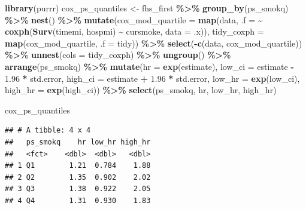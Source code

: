 \documentclass[
]{book}
\newenvironment{Shaded}{\begin{snugshade}}{\end{snugshade}}
\newcommand{\AttributeTok}[1]{\textcolor[rgb]{0.13,0.29,0.53}{#1}}
\newcommand{\FloatTok}[1]{\textcolor[rgb]{0.00,0.00,0.81}{#1}}
\newcommand{\FunctionTok}[1]{\textcolor[rgb]{0.13,0.29,0.53}{\textbf{#1}}}
\newcommand{\NormalTok}[1]{#1}
\newcommand{\OtherTok}[1]{\textcolor[rgb]{0.56,0.35,0.01}{#1}}
\newcommand{\SpecialCharTok}[1]{\textcolor[rgb]{0.81,0.36,0.00}{\textbf{#1}}}
\begin{document}
\begin{Shaded}
\begin{Highlighting}[]
\FunctionTok{library}\NormalTok{(purrr)}
\NormalTok{cox\_ps\_quantiles }\OtherTok{\textless{}{-}}\NormalTok{ fhs\_first }\SpecialCharTok{\%\textgreater{}\%} 
  \FunctionTok{group\_by}\NormalTok{(ps\_smokq) }\SpecialCharTok{\%\textgreater{}\%} 
  \FunctionTok{nest}\NormalTok{() }\SpecialCharTok{\%\textgreater{}\%} 
  \FunctionTok{mutate}\NormalTok{(}\AttributeTok{cox\_mod\_quartile =} \FunctionTok{map}\NormalTok{(data, }
                                \AttributeTok{.f =} \SpecialCharTok{\textasciitilde{}} \FunctionTok{coxph}\NormalTok{(}\FunctionTok{Surv}\NormalTok{(timemi, hospmi) }\SpecialCharTok{\textasciitilde{}} 
\NormalTok{                                               cursmoke, }
                                             \AttributeTok{data =}\NormalTok{ .x)),}
         \AttributeTok{tidy\_coxph =} \FunctionTok{map}\NormalTok{(cox\_mod\_quartile, }\AttributeTok{.f =}\NormalTok{ tidy)) }\SpecialCharTok{\%\textgreater{}\%} 
  \FunctionTok{select}\NormalTok{(}\SpecialCharTok{{-}}\FunctionTok{c}\NormalTok{(data, cox\_mod\_quartile)) }\SpecialCharTok{\%\textgreater{}\%} 
  \FunctionTok{unnest}\NormalTok{(}\AttributeTok{cols =}\NormalTok{ tidy\_coxph) }\SpecialCharTok{\%\textgreater{}\%} 
  \FunctionTok{ungroup}\NormalTok{() }\SpecialCharTok{\%\textgreater{}\%} 
  \FunctionTok{arrange}\NormalTok{(ps\_smokq) }\SpecialCharTok{\%\textgreater{}\%} 
  \FunctionTok{mutate}\NormalTok{(}\AttributeTok{hr =} \FunctionTok{exp}\NormalTok{(estimate),}
         \AttributeTok{low\_ci =}\NormalTok{ estimate }\SpecialCharTok{{-}} \FloatTok{1.96} \SpecialCharTok{*}\NormalTok{ std.error, }
         \AttributeTok{high\_ci =}\NormalTok{ estimate }\SpecialCharTok{+} \FloatTok{1.96} \SpecialCharTok{*}\NormalTok{ std.error, }
         \AttributeTok{low\_hr =} \FunctionTok{exp}\NormalTok{(low\_ci), }
         \AttributeTok{high\_hr =} \FunctionTok{exp}\NormalTok{(high\_ci)) }\SpecialCharTok{\%\textgreater{}\%} 
  \FunctionTok{select}\NormalTok{(ps\_smokq, hr, low\_hr, high\_hr)}

\NormalTok{cox\_ps\_quantiles}
\end{Highlighting}
\end{Shaded}

\begin{verbatim}
## # A tibble: 4 x 4
##   ps_smokq    hr low_hr high_hr
##   <fct>    <dbl>  <dbl>   <dbl>
## 1 Q1        1.21  0.784    1.88
## 2 Q2        1.35  0.902    2.02
## 3 Q3        1.38  0.922    2.05
## 4 Q4        1.31  0.930    1.83
\end{verbatim}
\end{document}
